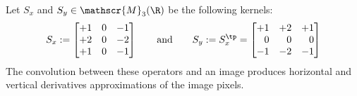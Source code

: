 \begin{example}
    Let $S_x$ and $S_y\in\mathscr{M}_{3}(\R)$ be the following kernels:
    \begin{equation*}
        S_x := \begin{bmatrix}
            +1 & 0 & -1\\
            +2 & 0 & -2\\
            +1 & 0 & -1
        \end{bmatrix}
        \qquad\textnormal{and}\qquad
        S_y := S_x^\tp = \begin{bmatrix}
            +1 & +2 & +1\\
            \phantom{+}0 & \phantom{+}0 & \phantom{+}0\\
            -1 & -2 & -1
        \end{bmatrix}
    \end{equation*}
    The convolution between these operators and an image produces horizontal and vertical derivatives approximations of the image pixels.

    \begin{figure}[H]
        \centering
    

\end{figure}
\end{example}
